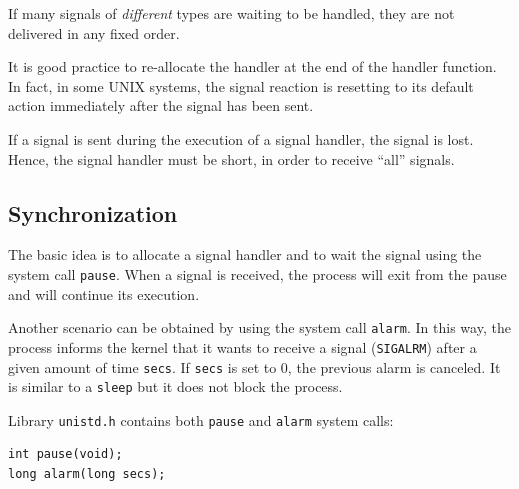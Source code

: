 If many signals of \emph{different} types are waiting to be handled, they are not delivered in any fixed order.

It is good practice to re-allocate the handler at the end of the handler function. In fact, in some UNIX systems, the signal reaction is resetting to its default action immediately after the signal has been sent.

If a signal is sent during the execution of a signal handler, the signal is lost. Hence, the signal handler must be short, in order to receive
``all'' signals.

\subsection{Synchronization}
The basic idea is to allocate a signal handler and to wait the signal using the system call \texttt{pause}. When a signal is received, the process will exit from the pause and will continue its execution.

Another scenario can be obtained by using the system call \texttt{alarm}. In this way, the process informs the kernel that it wants to receive a signal (\texttt{SIGALRM}) after a given amount of time \texttt{secs}. If \texttt{secs} is set to 0, the previous alarm is canceled.
It is similar to a \texttt{sleep} but it does not block the process.

Library \texttt{unistd.h} contains both \texttt{pause} and \texttt{alarm} system calls:
\begin{verbatim}
int pause(void);
long alarm(long secs);
\end{verbatim}